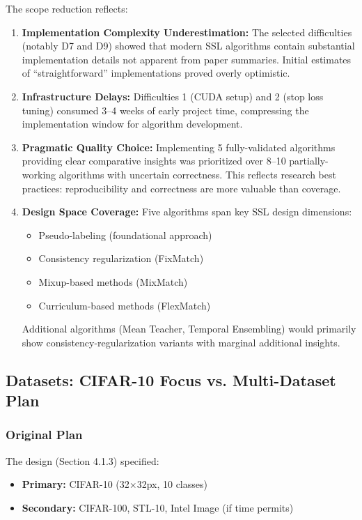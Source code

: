 The scope reduction reflects:

\begin{enumerate}
    \item \textbf{Implementation Complexity Underestimation:} The selected difficulties (notably D7 and D9) showed that modern SSL algorithms contain substantial implementation details not apparent from paper summaries. Initial estimates of ``straightforward'' implementations proved overly optimistic.

    \item \textbf{Infrastructure Delays:} Difficulties 1 (CUDA setup) and 2 (stop loss tuning) consumed 3--4 weeks of early project time, compressing the implementation window for algorithm development.

    \item \textbf{Pragmatic Quality Choice:} Implementing 5 fully-validated algorithms providing clear comparative insights was prioritized over 8--10 partially-working algorithms with uncertain correctness. This reflects research best practices: reproducibility and correctness are more valuable than coverage.

    \item \textbf{Design Space Coverage:} Five algorithms span key SSL design dimensions:
        \begin{itemize}
            \item Pseudo-labeling (foundational approach)
            \item Consistency regularization (FixMatch)
            \item Mixup-based methods (MixMatch)
            \item Curriculum-based methods (FlexMatch)
        \end{itemize}
        Additional algorithms (Mean Teacher, Temporal Ensembling) would primarily show consistency-regularization variants with marginal additional insights.
\end{enumerate}

\subsection{Datasets: CIFAR-10 Focus vs. Multi-Dataset Plan}

\subsubsection{Original Plan}

The design (Section 4.1.3) specified:
\begin{itemize}
    \item \textbf{Primary:} CIFAR-10 (32$\times$32px, 10 classes)
    \item \textbf{Secondary:} CIFAR-100, STL-10, Intel Image (if time permits)
\end{itemize}

